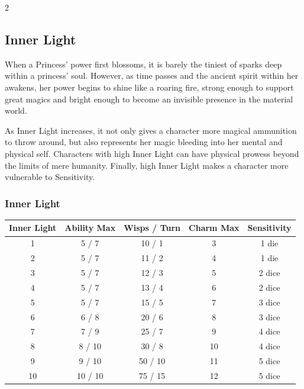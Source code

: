 \begin{multicols}{2}
\subsection*{Inner Light}
\label{subsec:InnerLight}
When a Princess' power first blossoms, it is barely the tiniest of sparks deep within a princess' soul. However, as time passes and the ancient spirit within her awakens, her power begins to shine like a roaring fire, strong enough to support great magics and bright enough to become an invisible presence in the material world.

As Inner Light increases, it not only gives a character more magical ammunition to throw around, but also represents her magic bleeding into her mental and physical self. Characters with high Inner Light can have physical prowess beyond the limits of mere humanity. Finally, high Inner Light makes a character more vulnerable to Sensitivity. 

	\bigsidebarstart
	
	\subsubsection*{Inner Light}
	
    \centering
    \begin{tabular}{|c|c|c|c|c|}
        \hline
        Inner Light & Ability Max & Wisps / Turn & Charm Max & Sensitivity \\ \hline
        1           & 5 / 7       & 10 / 1       & 3         & 1 die       \\ \hline
        2           & 5 / 7       & 11 / 2       & 4         & 1 die       \\ \hline
        3           & 5 / 7       & 12 / 3       & 5         & 2 dice      \\ \hline
        4           & 5 / 7       & 13 / 4       & 6         & 2 dice      \\ \hline
        5           & 5 / 7       & 15 / 5       & 7         & 3 dice      \\ \hline
        6           & 6 / 8       & 20 / 6       & 8         & 3 dice      \\ \hline
        7           & 7 / 9       & 25 / 7       & 9         & 4 dice      \\ \hline
        8           & 8 / 10       & 30 / 8       & 10        & 4 dice      \\ \hline
        9           & 9 / 10       & 50 / 10      & 11        & 5 dice      \\ \hline
        10          & 10 / 10     & 75 / 15     & 12        & 5 dice      \\
        \hline
    \end{tabular}
	\bigsidebarend


\end{multicols}

